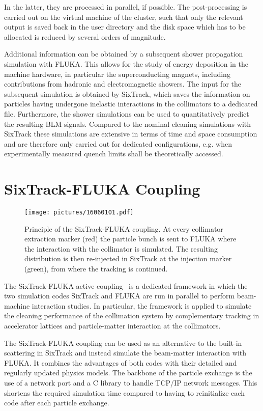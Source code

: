 In the latter, they are processed in parallel, if possible. The post-processing is carried out on the virtual machine of the cluster, such that only the relevant output is saved back in the user directory and the disk space which has to be allocated  is reduced by several orders of magnitude. 


Additional information can be obtained by a subsequent shower propagation simulation with FLUKA. This allows for the study of energy deposition in the machine hardware, in particular the superconducting magnets, including contributions from hadronic and electromagnetic showers. The input for the subsequent simulation is obtained by SixTrack, which saves the information on particles having undergone inelastic interactions in the collimators to a dedicated file.  Furthermore, the shower simulations can be used to quantitatively predict the resulting BLM signals. Compared to the nominal cleaning simulations with SixTrack these simulations are extensive in terms of time and space consumption and are therefore only carried out for dedicated configurations, e.g. when experimentally measured quench limits shall be theoretically accessed.


\section{SixTrack-FLUKA Coupling}

\begin{figure}[b]  
    \centering
    \texttt{[image: pictures/16060101.pdf]}
    \caption{Principle of the SixTrack-FLUKA coupling. At every collimator extraction marker (red) the particle bunch is sent to FLUKA where the interaction with the collimator is simulated. The resulting distribution is then re-injected in SixTrack at the injection marker (green), from where the tracking is continued.}  
    \label{pic:16060101}
\end{figure}


The SixTrack-FLUKA active coupling~\cite{mereghetti_ipac2013_1} is a dedicated framework in which the two simulation codes SixTrack and FLUKA are run in parallel to perform beam-machine interaction studies. In particular, the framework is applied to simulate the cleaning performance of the collimation system by complementary tracking in accelerator lattices and particle-matter interaction at the collimators. 

The SixTrack-FLUKA coupling can be used as an alternative to the built-in scattering in SixTrack and instead simulate the beam-matter interaction with FLUKA. It combines the advantages of both codes with their detailed and regularly updated physics models. The backbone of the particle exchange is the use of a network port and a C library to handle TCP/IP network messages. 
This shortens the required simulation time compared to having to reinitialize each code after each particle exchange.


